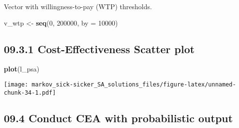 \documentclass[
]{article}
\newenvironment{Shaded}{\begin{snugshade}}{\end{snugshade}}
\newcommand{\CommentTok}[1]{\textcolor[rgb]{0.56,0.35,0.01}{\textit{#1}}}
\newcommand{\DataTypeTok}[1]{\textcolor[rgb]{0.13,0.29,0.53}{#1}}
\newcommand{\DecValTok}[1]{\textcolor[rgb]{0.00,0.00,0.81}{#1}}
\newcommand{\KeywordTok}[1]{\textcolor[rgb]{0.13,0.29,0.53}{\textbf{#1}}}
\newcommand{\NormalTok}[1]{#1}
\newcommand{\OperatorTok}[1]{\textcolor[rgb]{0.81,0.36,0.00}{\textbf{#1}}}
\newcommand{\StringTok}[1]{\textcolor[rgb]{0.31,0.60,0.02}{#1}}
\begin{document}
Vector with willingness-to-pay (WTP) thresholds.

\begin{Shaded}
\begin{Highlighting}[]
\NormalTok{v_wtp <-}\StringTok{ }\KeywordTok{seq}\NormalTok{(}\DecValTok{0}\NormalTok{, }\DecValTok{200000}\NormalTok{, }\DataTypeTok{by =} \DecValTok{10000}\NormalTok{)}
\end{Highlighting}
\end{Shaded}

\hypertarget{cost-effectiveness-scatter-plot}{%
\subsection{09.3.1 Cost-Effectiveness Scatter
plot}\label{cost-effectiveness-scatter-plot}}

\begin{Shaded}
\begin{Highlighting}[]
\KeywordTok{plot}\NormalTok{(l_psa)}
\end{Highlighting}
\end{Shaded}

\texttt{[image: markov\_sick-sicker\_SA\_solutions\_files/figure-latex/unnamed-chunk-34-1.pdf]}

\hypertarget{conduct-cea-with-probabilistic-output}{%
\subsection{09.4 Conduct CEA with probabilistic
output}\label{conduct-cea-with-probabilistic-output}}

\begin{Shaded}
\end{Shaded}
\end{document}
